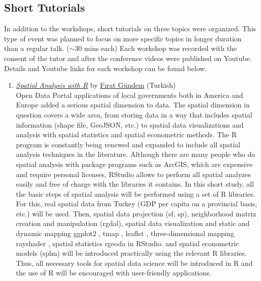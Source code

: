 \subsection{Short Tutorials}

In addition to the workshops, short tutorials on three topics were  organized. This type of event was planned to focus on more specific topics in longer duration than a regular talk. ($\sim 30$ mins each) Each workshop was recorded with the consent of the tutor and after the conference videos were published on Youtube. Details and Youtube links for each workshop can be found below. 

\begin{enumerate}
    \item \textit{\href{https://www.youtube.com/watch?v=4LRYv36Ik2k}{Spatial Analysis with R}} by \href{https://www.linkedin.com/in/f\%C4\%B1rat-g\%C3\%BCndem-380496108/}{Fırat Gündem} (Turkish)\\ Open Data Portal applications of local governments both in America and Europe added a serious spatial dimension to data. The spatial dimension in question covers a wide area, from storing data in a way that includes spatial information (shape file, GeoJSON, etc.) to spatial data visualizations and analysis with spatial statistics and spatial econometric methods. The R program is constantly being renewed and expanded to include all spatial analysis techniques in the literature. Although there are many people who do spatial analysis with package programs such as ArcGIS, which are expensive and require personal licenses, RStudio allows to perform all spatial analyzes easily and free of charge with the libraries it contains. In this short study, all the basic steps of spatial analysis will be performed using a set of R libraries. For this, real spatial data from Turkey (GDP per capita on a provincial basis, etc.) will be used. Then, spatial data projection (sf, sp), neighborhood matrix creation and manipulation (rgdal), spatial data visualization and static and dynamic mapping ggplot2 \citep{ggplot2}, tmap \citep{tmap}, leaflet \citep{leaflet}, three-dimensional mapping rayshader \citep{rayshader}, spatial statistics rgeoda \citep{rgeoda} in RStudio. and spatial econometric models (splm) will be introduced practically using the relevant R libraries. Thus, all necessary tools for spatial data science will be introduced in R and the use of R will be encouraged with user-friendly applications.\\
    

\end{enumerate}
